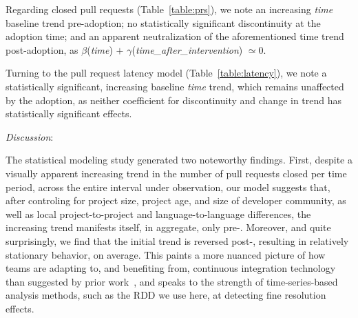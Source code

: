 Regarding closed pull requests (Table~\ref{table:prs}), we note an increasing
\emph{time} baseline trend pre-adoption; no statistically significant discontinuity
at the adoption time; and an apparent neutralization of the aforementioned time
trend post-adoption, as $\beta$(\emph{time}) $+$ 
$\gamma$(\emph{time\_after\_intervention}) $\simeq 0$.

Turning to the pull request latency model (Table~\ref{table:latency}), we note
a statistically significant, increasing baseline \emph{time} trend, which remains
unaffected by the \Tvis adoption, as neither coefficient for discontinuity and
change in trend has statistically significant effects.



\smallskip\noindent \emph{Discussion}:

The statistical modeling study generated two noteworthy findings.
First, despite a visually apparent increasing trend in the number of pull requests 
closed per time period, across the entire interval under observation, our model 
suggests that, after controling for project size, project age, and size of developer 
community, as well as local project-to-project and language-to-language differences, 
the increasing trend manifests itself, in aggregate, only pre-\Tvi.
Moreover, and quite surprisingly, we find that the initial trend is reversed post-\Tvi,
resulting in relatively stationary behavior, on average.
This paints a more nuanced picture of how \GH teams are adapting to, and
benefiting from, continuous integration technology than suggested by prior
work~\cite{VasilescuYWDF15}, and speaks to the strength of time-series-based
analysis methods, such as the RDD we use here, at detecting fine resolution effects.

